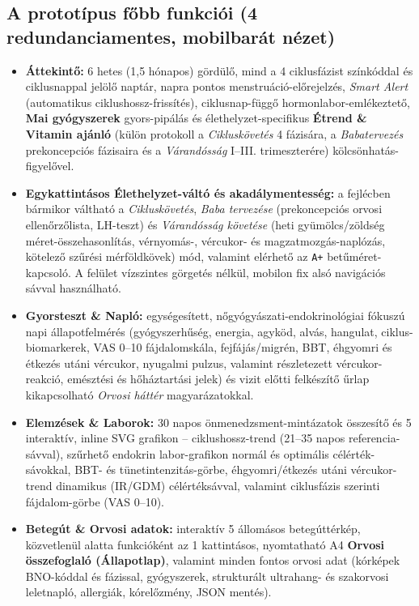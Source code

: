 \documentclass[10pt,a4paper]{article}
\begin{document}
\subsection{A prototípus főbb funkciói (4 redundanciamentes, mobilbarát nézet)}
\begin{itemize}
  \item \textbf{Áttekintő:} 6 hetes (1,5 hónapos) gördülő, mind a 4 ciklusfázist színkóddal és ciklusnappal jelölő naptár, napra pontos menstruáció-előrejelzés, \textit{Smart Alert} (automatikus ciklushossz-frissítés), ciklusnap-függő hormonlabor-emlékeztető, \textbf{Mai gyógyszerek} gyors-pipálás és élethelyzet-specifikus \textbf{Étrend \& Vitamin ajánló} (külön protokoll a \textit{Cikluskövetés} 4 fázisára, a \textit{Babatervezés} prekoncepciós fázisaira és a \textit{Várandósság} I--III. trimeszterére) kölcsönhatás-figyelővel.
  \item \textbf{Egykattintásos Élethelyzet-váltó és akadálymentesség:} a fejlécben bármikor váltható a \textit{Cikluskövetés}, \textit{Baba tervezése} (prekoncepciós orvosi ellenőrzőlista, LH-teszt) és \textit{Várandósság követése} (heti gyümölcs/zöldség méret-összehasonlítás, vérnyomás-, vércukor- és magzatmozgás-naplózás, kötelező szűrési mérföldkövek) mód, valamint elérhető az \texttt{A+} betűméret-kapcsoló. A felület vízszintes görgetés nélkül, mobilon fix alsó navigációs sávval használható.
  \item \textbf{Gyorsteszt \& Napló:} egységesített, nőgyógyászati-endokrinológiai fókuszú napi állapotfelmérés (gyógyszerhűség, energia, agyköd, alvás, hangulat, ciklus-biomarkerek, VAS 0--10 fájdalomskála, fejfájás/migrén, BBT, éhgyomri és étkezés utáni vércukor, nyugalmi pulzus, valamint részletezett vércukor-reakció, emésztési és hőháztartási jelek) és vizit előtti felkészítő űrlap kikapcsolható \textit{Orvosi háttér} magyarázatokkal.
  \item \textbf{Elemzések \& Laborok:} 30 napos önmenedzsment-mintázatok összesítő és 5 interaktív, inline SVG grafikon -- ciklushossz-trend (21--35 napos referencia-sávval), szűrhető endokrin labor-grafikon normál és optimális célérték-sávokkal, BBT- és tünetintenzitás-görbe, éhgyomri/étkezés utáni vércukor-trend dinamikus (IR/GDM) célértéksávval, valamint ciklusfázis szerinti fájdalom-görbe (VAS 0--10).
  \item \textbf{Betegút \& Orvosi adatok:} interaktív 5 állomásos betegúttérkép, közvetlenül alatta funkcióként az 1 kattintásos, nyomtatható A4 \textbf{Orvosi összefoglaló (Állapotlap)}, valamint minden fontos orvosi adat (kórképek BNO-kóddal és fázissal, gyógyszerek, strukturált ultrahang- és szakorvosi leletnapló, allergiák, kórelőzmény, JSON mentés).
\end{itemize}
\end{document}
